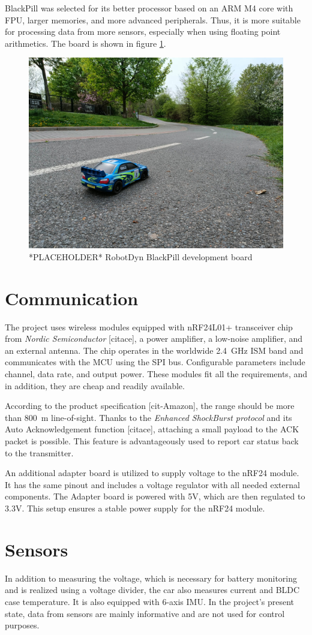 BlackPill was selected for its better processor based on an ARM M4 core with FPU, larger memories, and more advanced peripherals. Thus, it is more suitable for processing data from more sensors, especially when using floating point arithmetics. The board is shown in figure \ref{fig:black_pill}.
\begin{figure}[t]
\centering
\includegraphics[width=0.5\linewidth]{fig/placeholder.jpg}
\caption{*PLACEHOLDER* RobotDyn BlackPill development board}
\label{fig:black_pill}
\end{figure}


\section{Communication}
\label{sec:hw_comm}
The project uses wireless modules equipped with nRF24L01+ transceiver chip from \textit{Nordic Semiconductor} [\todo citace], a power amplifier, a low-noise amplifier, and an external antenna. The chip operates in the worldwide \SI{2.4}{\GHz} ISM band and communicates with the MCU using the SPI bus. Configurable parameters include channel, data rate, and output power. These modules fit all the requirements, and in addition, they are cheap and readily available.

According to the product specification [\todo cit-Amazon], the range should be more than \SI{800}{\m} line-of-sight. Thanks to the \textit{Enhanced ShockBurst protocol} and its Auto Acknowledgement function [\todo citace], attaching a small payload to the ACK packet is possible. This feature is advantageously used to report car status back to the transmitter.

An additional adapter board is utilized to supply voltage to the nRF24 module. It has the same pinout and includes a voltage regulator with all needed external components. The Adapter board is powered with 5V, which are then regulated to 3.3V. This setup ensures a stable power supply for the nRF24 module.


\section{Sensors}
\label{hw_sensors}
In addition to measuring the voltage, which is necessary for battery monitoring and is realized using a voltage divider, the car also measures current and BLDC case temperature. It is also equipped with 6-axis IMU. In the project's present state, data from sensors are mainly informative and are not used for control purposes.

